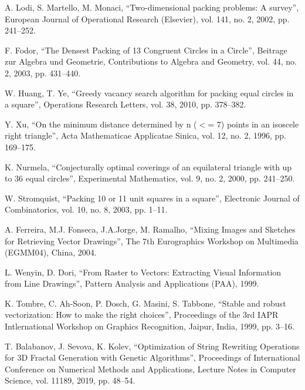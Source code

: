 \documentclass[conference]{IEEEtran}
\begin{document}
\begin{thebibliography}{00}

 A. Lodi, S. Martello, M. Monaci, ``Two-dimensional packing problems: A survey'', European Journal of Operational Research (Elsevier), vol. 141, no. 2, 2002, pp. 241--252.

 F. Fodor, ``The Densest Packing of 13 Congruent Circles in a Circle'', Beitrage zur Algebra und Geometrie, Contributions to Algebra and Geometry, vol. 44, no. 2, 2003, pp. 431--440.

 W. Huang, T. Ye, ``Greedy vacancy search algorithm for packing equal circles in a square'', Operations Research Letters, vol. 38, 2010, pp. 378--382.

 Y. Xu, ``On the minimum distance determined by n ($<$= 7) points in an isoscele right triangle'', Acta Mathematicae Applicatae Sinica, vol. 12, no. 2, 1996, pp. 169--175.

 K. Nurmela, ``Conjecturally optimal coverings of an equilateral triangle with up to 36 equal circles'', Experimental Mathematics, vol. 9, no. 2, 2000, pp. 241--250.

 W. Stromquist, ``Packing 10 or 11 unit squares in a square'', Electronic Journal of Combinatorics, vol. 10, no. 8, 2003, pp. 1--11.

 A. Ferreira, M.J. Fonseca, J.A.Jorge, M. Ramalho, ``Mixing Images and Sketches for Retrieving Vector Drawings'', The 7th Eurographics Workshop on Multimedia (EGMM04), China, 2004.

 L. Wenyin, D. Dori, ``From Raster to Vectors: Extracting Visual Information from Line Drawings'', Pattern Analysis and Applications (PAA), 1999.

 K. Tombre, C. Ah-Soon, P. Dosch, G. Masini, S. Tabbone, ``Stable and robust vectorization: How to make the right choices'', Proceedings of the 3rd IAPR Intlernational Workshop on Graphics Recognition, Jaipur, India, 1999, pp. 3--16.

 T. Balabanov, J. Sevova, K. Kolev, ``Optimization of String Rewriting Operations for 3D Fractal Generation with Genetic Algorithms'', Proceedings of International Conference on Numerical Methods and Applications, Lecture Notes in Computer Science, vol. 11189, 2019, pp. 48--54.


\end{thebibliography}
\end{document}
